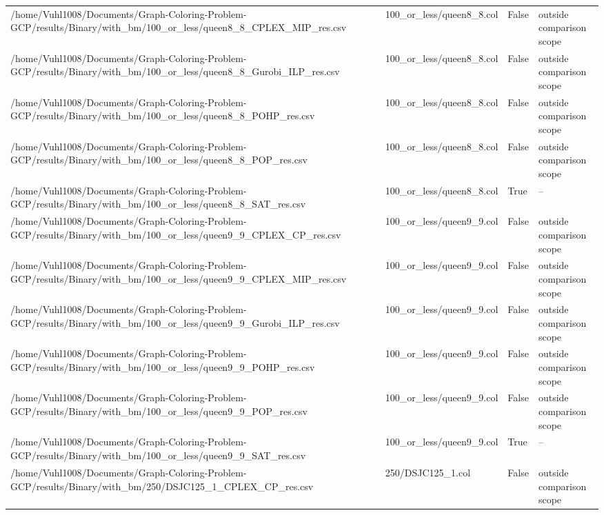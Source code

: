 \begin{table}[htbp]
\begin{tabular}{llll}
/home/Vuhl1008/Documents/Graph-Coloring-Problem-GCP/results/Binary/with\_bm/100\_or\_less/queen8\_8\_CPLEX\_MIP\_res.csv & 100\_or\_less/queen8\_8.col & False & outside comparison scope \\
/home/Vuhl1008/Documents/Graph-Coloring-Problem-GCP/results/Binary/with\_bm/100\_or\_less/queen8\_8\_Gurobi\_ILP\_res.csv & 100\_or\_less/queen8\_8.col & False & outside comparison scope \\
/home/Vuhl1008/Documents/Graph-Coloring-Problem-GCP/results/Binary/with\_bm/100\_or\_less/queen8\_8\_POHP\_res.csv & 100\_or\_less/queen8\_8.col & False & outside comparison scope \\
/home/Vuhl1008/Documents/Graph-Coloring-Problem-GCP/results/Binary/with\_bm/100\_or\_less/queen8\_8\_POP\_res.csv & 100\_or\_less/queen8\_8.col & False & outside comparison scope \\
/home/Vuhl1008/Documents/Graph-Coloring-Problem-GCP/results/Binary/with\_bm/100\_or\_less/queen8\_8\_SAT\_res.csv & 100\_or\_less/queen8\_8.col & True & -- \\
/home/Vuhl1008/Documents/Graph-Coloring-Problem-GCP/results/Binary/with\_bm/100\_or\_less/queen9\_9\_CPLEX\_CP\_res.csv & 100\_or\_less/queen9\_9.col & False & outside comparison scope \\
/home/Vuhl1008/Documents/Graph-Coloring-Problem-GCP/results/Binary/with\_bm/100\_or\_less/queen9\_9\_CPLEX\_MIP\_res.csv & 100\_or\_less/queen9\_9.col & False & outside comparison scope \\
/home/Vuhl1008/Documents/Graph-Coloring-Problem-GCP/results/Binary/with\_bm/100\_or\_less/queen9\_9\_Gurobi\_ILP\_res.csv & 100\_or\_less/queen9\_9.col & False & outside comparison scope \\
/home/Vuhl1008/Documents/Graph-Coloring-Problem-GCP/results/Binary/with\_bm/100\_or\_less/queen9\_9\_POHP\_res.csv & 100\_or\_less/queen9\_9.col & False & outside comparison scope \\
/home/Vuhl1008/Documents/Graph-Coloring-Problem-GCP/results/Binary/with\_bm/100\_or\_less/queen9\_9\_POP\_res.csv & 100\_or\_less/queen9\_9.col & False & outside comparison scope \\
/home/Vuhl1008/Documents/Graph-Coloring-Problem-GCP/results/Binary/with\_bm/100\_or\_less/queen9\_9\_SAT\_res.csv & 100\_or\_less/queen9\_9.col & True & -- \\
/home/Vuhl1008/Documents/Graph-Coloring-Problem-GCP/results/Binary/with\_bm/250/DSJC125\_1\_CPLEX\_CP\_res.csv & 250/DSJC125\_1.col & False & outside comparison scope \\

\end{tabular}
\end{table}
